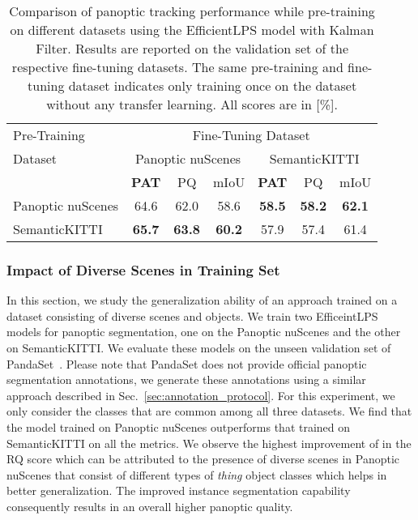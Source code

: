 \documentclass[letterpaper, 10 pt, journal, twoside]{IEEEtran}
\newcommand{\secref}[1]{Sec.~\ref{#1}}
\newcommand{\newmet}{PAT}
\begin{document}
\begin{table}
\centering
\caption{Comparison of panoptic tracking performance while pre-training on different datasets using the EfficientLPS model with Kalman Filter. Results are reported on the validation set of the respective fine-tuning datasets. The same pre-training and fine-tuning dataset indicates only training once on the dataset without any transfer learning. All scores are in [\%].}
\label{tab:pretrainingNew}
\footnotesize
\begin{tabular}{l|ccc|ccc}
\toprule
Pre-Training & \multicolumn{6}{c}{Fine-Tuning Dataset} \\
\cmidrule{2-7}
Dataset &  \multicolumn{3}{c|}{Panoptic nuScenes} & \multicolumn{3}{c}{SemanticKITTI} \\
\cmidrule{2-7}
& {\textbf{\newmet}} & PQ & mIoU & {\textbf{\newmet}} & PQ & mIoU  \\
\midrule
Panoptic nuScenes & 64.6 & 62.0  & 58.6 & \textbf{58.5} & \textbf{58.2}  & \textbf{62.1} \\
SemanticKITTI & \textbf{65.7} & \textbf{63.8} & \textbf{60.2} & 57.9 & 57.4  & 61.4 \\
\bottomrule
\end{tabular}
\vspace{-0.2cm}
\end{table}

\subsubsection{Impact of Diverse Scenes in Training Set}
\label{sec:generalize}
In this section, we study the generalization ability of an approach trained on a dataset consisting of diverse scenes and objects. We train two EfficeintLPS models for panoptic segmentation, one on the Panoptic nuScenes and the other on SemanticKITTI. We evaluate these models on the unseen validation set of PandaSet~\cite{pandaset}. Please note that PandaSet does not provide official panoptic segmentation annotations, we generate these annotations using a similar approach described in \secref{sec:annotation_protocol}. For this experiment, we only consider the classes that are common among all three datasets. We find that the model trained on Panoptic nuScenes outperforms that trained on SemanticKITTI on all the metrics. We observe the highest improvement of  in the RQ score which can be attributed to the presence of diverse scenes in Panoptic nuScenes that consist of different types of \emph{thing} object classes which helps in better generalization. The improved instance segmentation capability consequently results in an overall higher panoptic quality.
\end{document}
